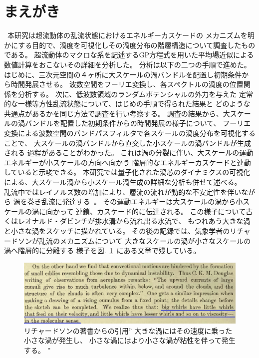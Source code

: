 \documentclass[12pt,a4paper]{jbook}
\begin{document}
		\section{まえがき}
		\ 本研究は超流動体の乱流状態におけるエネルギーカスケードの
        メカニズムを明かにする目的で、渦度を可視化しその渦度分布の階層構造について調査したものである。
		超流動体のマクロな系を記述するGP方程式を用いた平均場近似による
		数値計算をおこないその詳細を分析した。
		分析は以下の二つの手順で進めた。
		はじめに、三次元空間の４ヶ所に大スケールの渦バンドルを配置し初期条件から時間発展させる。
        波数空間をフーリエ変換し、各スペクトルの渦度の位置関係を分析する。
		次に、低波数領域のランダムポテンシャルの外力を与えた
        定常的な一様等方性乱流状態について、はじめの手順で得られた結果と
        どのような共通点があるかを同じ方法で調査を行い考察する。
        調査の結果から、大スケールの渦バンドルを配置した初期条件からの時間発展の様子について、
		フーリエ変換による波数空間のバンドパスフィルタで各スケールの渦度分布を可視化することで、
		大スケールの渦バンドルから直交した小スケールの渦バンドルが生成される
		過程があることがわかった。
		これは渦の分裂に伴い、大スケールの運動エネルギーが小スケールの方向へ向かう
		階層的なエネルギーカスケードと連動していると示唆できる。
		本研究では量子化された渦芯のダイナミクスの可視化による、大スケール渦から小スケール渦生成の詳細な分析も併せて述べる。
		\\
		乱流中ではレイノルズ数の増加により、層流の流れが動的な不安定性を伴いながら
		渦を巻き乱流に発達する~\cite{Reynolds}。
		その運動エネルギーは大スケールの渦から小スケールの渦に向かって
        連鎖、カスケード的に伝達される。
		この様子について古くはレオナルド・ダビンチが排水溝から流れ出る水流で、
		もつれあう大きな渦と小さな渦をスケッチに描かれている。
		その後の記録では、気象学者のリチャードソンが乱流のメカニズムについて
		大きなスケールの渦が小さなスケールの渦へ階層的に分離する
		様子を図.~\ref{FIG:richardson_cascade}~\cite{Richardson}にある文章で残している。
        \begin{figure}[H]
			    \begin{center}
			    \includegraphics[width=14cm]{richardson_cascade.eps}
			    \caption{
                    リチャードソンの著書からの引用”
                    大きな渦にはその速度に乗った小さな渦が発生し、
                    小さな渦にはより小さな渦が粘性を伴って発生する。
                    ” ~\cite{Richardson}
                }
			    \label{FIG:richardson_cascade}
			    \end{center}
        \end{figure}
\end{document}
